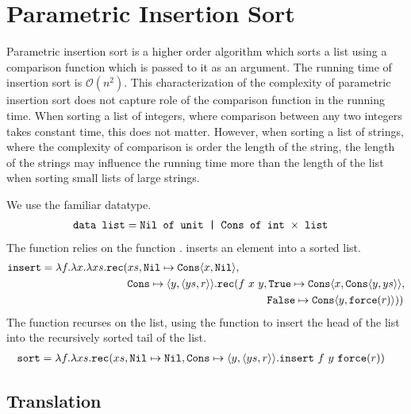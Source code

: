 \chapter{Parametric Insertion Sort}
%
Parametric insertion sort is a higher order algorithm which sorts a list using
a comparison function which is passed to it as an argument.  The running time
of insertion sort is $\mathcal{O}(n^2)$.  This characterization of the
complexity of parametric insertion sort does not capture role of the comparison
function in the running time.  When sorting a list of integers, where
comparison between any two integers takes constant time, this does not matter.
However, when sorting a list of strings, where the complexity of comparison is
order the length of the string, the length of the strings may influence the
running time more than the length of the list when sorting small lists of large
strings.

We use the familiar  datatype.
%
\begin{align*}
  \texttt{data list} &= \texttt{Nil of unit | Cons of int $\times$ list}
\end{align*}
%
The function  relies on the function .  inserts an
element into a sorted list.
%
\begin{align*}
  \texttt{insert} &= \lambda f.\lambda x.\lambda xs.\texttt{rec}(xs, \texttt{Nil} \mapsto \texttt{Cons} \langle x, \texttt{Nil}\rangle,\\
             &\qquad\quad\quad\quad\quad\quad\quad \texttt{Cons}\mapsto \langle y, \langle ys,r \rangle\rangle.\texttt{rec}(f\ x\ y, \texttt{True}\mapsto \texttt{Cons}\langle x,\texttt{Cons}\langle y,ys \rangle\rangle, \\
             &\qquad\quad\quad\quad\qquad\quad\quad\quad\qquad\quad\quad\quad\qquad\quad\quad\quad\quad \texttt{False}\mapsto \texttt{Cons}\langle y,\texttt{force}(r)\rangle))
\end{align*}
%
The  function recurses on the list, using the  function to
insert the head of the list into the recursively sorted tail of the list.
%
\begin{align*}
  \texttt{sort} &= \lambda f.\lambda xs.\texttt{rec}(xs, \texttt{Nil} \mapsto \texttt{Nil}, \texttt{Cons} \mapsto \langle y,\langle ys,r \rangle\rangle.\texttt{insert}\ f\ y\ \texttt{force}(r))
\end{align*}
%
\section{Translation}
%
